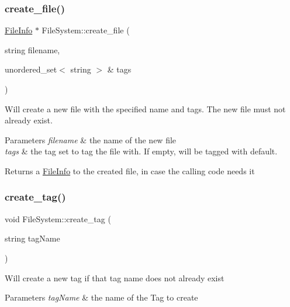 \subsubsection{\texorpdfstring{create\+\_\+file()}{create\_file()}}
{\footnotesize\ttfamily \mbox{\hyperlink{class_file_info}{File\+Info}} $\ast$ File\+System\+::create\+\_\+file (\begin{DoxyParamCaption}\item[{string}]{filename,  }\item[{unordered\+\_\+set$<$ string $>$ \&}]{tags }\end{DoxyParamCaption})}

Will create a new file with the specified name and tags. The new file must not already exist. 
\begin{DoxyParams}{Parameters}
{\em filename} & the name of the new file \\
\hline
{\em tags} & the tag set to tag the file with. If empty, will be tagged with default. \\
\hline
\end{DoxyParams}
\begin{DoxyReturn}{Returns}
a \mbox{\hyperlink{class_file_info}{File\+Info}} to the created file, in case the calling code needs it 
\end{DoxyReturn}
\mbox{\label{class_file_system_a678d743f3dc5b86c0b0c568795ec6a29}} 
\subsubsection{\texorpdfstring{create\+\_\+tag()}{create\_tag()}}
{\footnotesize\ttfamily void File\+System\+::create\+\_\+tag (\begin{DoxyParamCaption}\item[{string}]{tag\+Name }\end{DoxyParamCaption})}

Will create a new tag if that tag name does not already exist 
\begin{DoxyParams}{Parameters}
{\em tag\+Name} & the name of the Tag to create \\
\hline
\end{DoxyParams}
\mbox{\label{class_file_system_a2718456ead4a9e7244c33d4a86cb844c}} 
